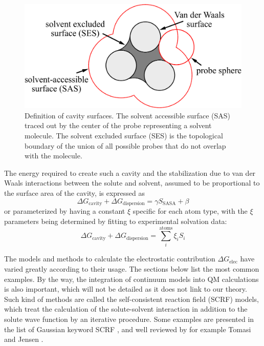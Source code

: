 \begin{figure}[h]
\begin{centering}
\includegraphics[width=0.55\columnwidth]{_figure/SASA}
\par\end{centering}

\caption[Definition of cavity surfaces]{Definition of cavity surfaces\label{fig:sasa}. The solvent accessible
surface (SAS) traced out by the center of the probe representing a
solvent molecule. The solvent excluded surface (SES) is the topological
boundary of the union of all possible probes that do not overlap with
the molecule.}
\end{figure}


The energy required to create such a cavity and the stabilization
due to van der Waals interactions between the solute and solvent,
assumed to be proportional to the surface area of the cavity, is expressed
as
\begin{equation}
\Delta G_{\mathrm{cavity}}+\Delta G_{\mathrm{dispersion}}=\gamma S_{\mathrm{SASA}}+\beta
\end{equation}
or parameterized by having a constant $\xi$ specific for each atom
type, with the $\xi$ parameters being determined by fitting to experimental
solvation data:
\begin{equation}
\Delta G_{\mathrm{cavity}}+\Delta G_{\mathrm{dispersion}}=\sum_{i}^{\mathrm{atoms}}\xi_{i}S_{i}
\end{equation}


The models and methods to calculate the electrostatic contribution
$\Delta G_{\mathrm{elec}}$ have varied greatly according to their
usage. The sections below list the most common examples. By the way,
the integration of continuum models into \acs{QM} calculations is
also important, which will not be detailed as it does not link to
our theory. Such kind of methods are called the self-consistent reaction
field (SCRF) models, which treat the calculation of the solute-solvent
interaction in addition to the solute wave function by an iterative
procedure. Some examples are presented in the list of Gaussian keyword
SCRF \citep{scrf}, and well reviewed by for example Tomasi \citep{Tomasi_1994_implicit_model,tomasi_quantum_2005}
and Jensen \citep{Jensen}.


